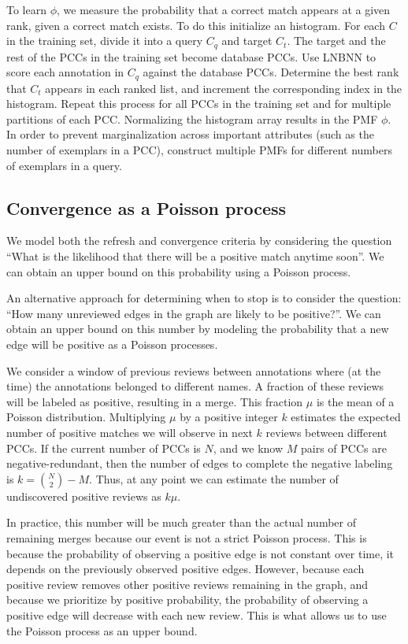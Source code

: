 To learn $\phi$, we measure the probability that a correct match appears at a given rank, given a correct match exists.
To do this initialize an histogram. For each $C$ in the training set, divide it into a query $C_q$ and target $C_t$. The
target and the rest of the PCCs in the training set become database PCCs. Use LNBNN to score each annotation in $C_q$
against the database PCCs. Determine the best rank that $C_t$ appears in each ranked list, and increment the
corresponding index in the histogram. Repeat this process for all PCCs in the training set and for multiple partitions
of each PCC. Normalizing the histogram array results in the PMF $\phi$. In order to prevent marginalization across
important attributes (such as the number of exemplars in a PCC), construct multiple PMFs for different numbers of
exemplars in a query.


\subsection{Convergence as a Poisson process}

We model both the refresh and convergence criteria by considering the question ``What is the likelihood that
  there will be a positive match anytime soon''.
We can obtain an upper bound on this probability using a Poisson process.


An alternative approach for determining when to stop is to consider the question: ``How many unreviewed edges in the
graph are likely to be positive?''. We can obtain an upper bound on this number by modeling the probability that a new
edge will be positive as a Poisson processes.

We consider a window of previous reviews between annotations where (at the time) the annotations belonged to different
names. A fraction of these reviews will be labeled as positive, resulting in a merge. This fraction $\mu$ is the mean of
a Poisson distribution. Multiplying $\mu$ by a positive integer $k$ estimates the expected number of positive matches we
will observe in next $k$ reviews between different PCCs. If the current number of PCCs is $N$, and we know $M$ pairs of
PCCs are negative-redundant, then the number of edges to complete the negative labeling is $k=\binom{N}{2} - M$. Thus,
at any point we can estimate the number of undiscovered positive reviews as $k\mu$.

In practice, this number will be much greater than the actual number of remaining merges because our event is not a
strict Poisson process. This is because the probability of observing a positive edge is not constant over time, it
depends on the previously observed positive edges. However, because each positive review removes other positive reviews
remaining in the graph, and because we prioritize by positive probability, the probability of observing a positive edge
will decrease with each new review. This is what allows us to use the Poisson process as an upper bound.

